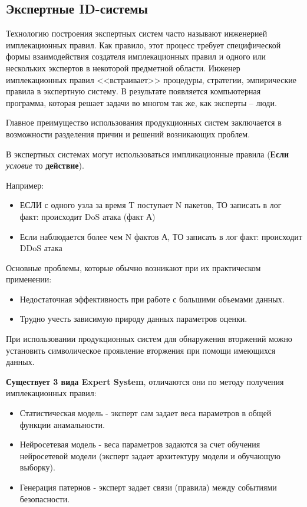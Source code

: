 \subsection{Экспертные ID-системы}

Технологию построения экспертных систем часто называют инженерией имплекационных правил. Как правило, 
этот процесс требует специфической формы взаимодействия создателя имплекационных правил и одного 
или нескольких экспертов в некоторой предметной области. Инженер имплекационных правил <<встраивает>>
процедуры, стратегии, эмпирические правила в экспертную систему. В результате появляется 
компьютерная программа, которая решает задачи во многом так же, как эксперты -- люди.
\autocite{BeynonDavies}

Главное преимущество использования продукционных систем заключается в возможности разделения причин и 
решений возникающих проблем.

В экспертных системах могут использоваться импликационные правила (\textbf{Если} \textit{условие} то 
\textbf{действие}).

Например:
\begin{itemize}
	\item ЕСЛИ с одного узла за время T поступает N пакетов, ТО записать в лог факт: 
	происходит DoS атака (факт А)
	
	\item Если наблюдается более чем N фактов А, ТО записать в лог факт: происходит DDoS атака
\end{itemize}

Основные проблемы, которые обычно возникают при их практическом применении:
\begin{itemize}
    \item Недостаточная эффективность при работе с большими объемами данных.
    \item Трудно учесть зависимую природу данных параметров оценки.
\end{itemize}

При использовании продукционных систем для обнаружения вторжений можно установить символическое 
проявление вторжения при помощи имеющихся данных.

\textbf{Существует 3 вида Expert System}, отличаются они по методу 
получения имплекационных 
правил\autocite{IDSystem}:

\begin{itemize}
	\item Статистическая модель - эксперт сам задает веса параметров в общей функции анамальности.
	\item Нейросетевая модель - веса параметров задаются за счет обучения нейросетевой модели 
	(эксперт задает архитектуру модели и обучающую выборку).
	\item Генерация патернов - эксперт задает связи (правила) между событиями безопасности.
\end{itemize}

